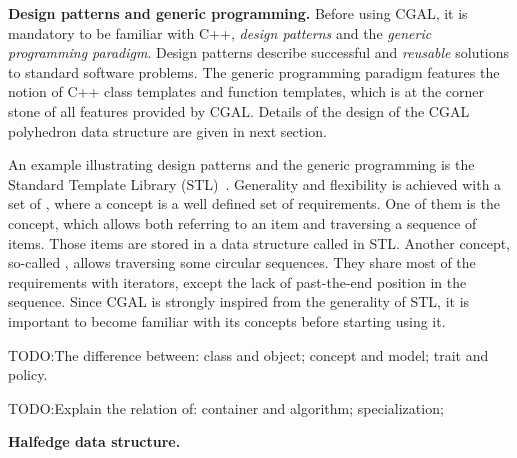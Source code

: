 \noindent \textbf{Design patterns and generic programming.}
Before using CGAL, it is mandatory to be familiar with C++,
\emph{design patterns} and the \emph{generic programming paradigm}. 
Design patterns \cite{Gamma:1995:DP} describe successful
and \emph{reusable} solutions to standard software problems.
The generic programming paradigm \cite{Alexandrescu:2001:MCD}
features the notion of C++ class templates and function 
templates, which is at the corner stone of all features 
provided by CGAL. Details of the design of the CGAL polyhedron
data structure are given in next section.

An example illustrating design patterns and the generic 
programming is the Standard Template
Library (STL)~\cite{ms-stl-96}. Generality and flexibility is achieved
with a set of , where a concept is a well defined set
of requirements. One of them is the  concept, which
allows both referring to an item and traversing a sequence of
items. Those items are stored in a data structure called
 in STL. Another concept, so-called
, allows traversing some circular sequences. They
share most of the requirements with iterators, except the lack of
past-the-end position in the sequence. Since CGAL is strongly inspired
from the generality of STL, it is important to become familiar with
its concepts before starting using it.

TODO:The difference between: class and object; concept and model; 
trait and policy.

TODO:Explain the relation of: container and algorithm; specialization;

\noindent \textbf{Halfedge data structure.}

